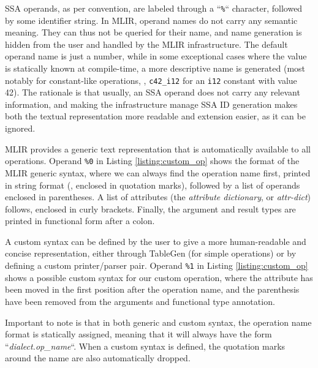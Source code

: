 SSA operands, as per convention, are labeled through a “\texttt{\%}“ character, followed by some identifier string. In MLIR, operand names do not carry any semantic meaning. They can thus not be queried for their name, and name generation is hidden from the user and handled by the MLIR infrastructure. The default operand name is just a number, while in some exceptional cases where the value is statically known at compile-time, a more descriptive name is generated (most notably for constant-like operations, \eg, \texttt{c42\_i12} for an \texttt{i12} constant with value 42). The rationale is that usually, an SSA operand does not carry any relevant information, and making the infrastructure manage SSA ID generation makes both the textual representation more readable and extension easier, as it can be ignored.

MLIR provides a generic text representation that is automatically available to all operations. Operand \texttt{\%0} in Listing \ref{listing:custom_op} shows the format of the MLIR generic syntax, where we can always find the operation name first, printed in string format (\ie, enclosed in quotation marks), followed by a list of operands enclosed in parentheses. A list of attributes (the \textit{attribute dictionary}, or \textit{attr-dict}) follows, enclosed in curly brackets. Finally, the argument and result types are printed in functional form after a colon.

A custom syntax can be defined by the user to give a more human-readable and concise representation, either through TableGen (for simple operations) or by defining a custom printer/parser pair. Operand \texttt{\%1} in Listing \ref{listing:custom_op} shows a possible custom syntax for our custom operation, where the attribute has been moved in the first position after the operation name, and the parenthesis have been removed from the arguments and functional type annotation.

Important to note is that in both generic and custom syntax, the operation name format is statically assigned, meaning that it will always have the form “\textit{dialect.op\_name}“. When a custom syntax is defined, the quotation marks around the name are also automatically dropped.



